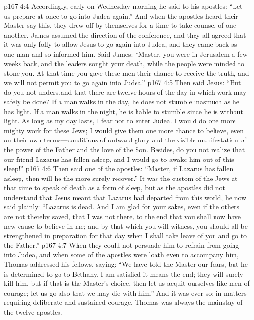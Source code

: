 \pc \vs p167 4:4 Accordingly, early on Wednesday morning he said to his apostles: \textcolor{ubdarkred}{“Let us prepare at once to go into Judea again.”} And when the apostles heard their Master say this, they drew off by themselves for a time to take counsel of one another. James assumed the direction of the conference, and they all agreed that it was only folly to allow Jesus to go again into Judea, and they came back as one man and so informed him. Said James: “Master, you were in Jerusalem a few weeks back, and the leaders sought your death, while the people were minded to stone you. At that time you gave these men their chance to receive the truth, and we will not permit you to go again into Judea.”
\vs p167 4:5 Then said Jesus: \textcolor{ubdarkred}{“But do you not understand that there are twelve hours of the day in which work may safely be done? If a man walks in the day, he does not stumble inasmuch as he has light. If a man walks in the night, he is liable to stumble since he is without light. As long as my day lasts, I fear not to enter Judea. I would do one more mighty work for these Jews; I would give them one more chance to believe, even on their own terms---conditions of outward glory and the visible manifestation of the power of the Father and the love of the Son. Besides, do you not realize that our friend Lazarus has fallen asleep, and I would go to awake him out of this sleep!”}
\vs p167 4:6 Then said one of the apostles: “Master, if Lazarus has fallen asleep, then will he the more surely recover.” It was the custom of the Jews at that time to speak of death as a form of sleep, but as the apostles did not understand that Jesus meant that Lazarus had departed from this world, he now said plainly: \textcolor{ubdarkred}{“Lazarus is dead. And I am glad for your sakes, even if the others are not thereby saved, that I was not there, to the end that you shall now have new cause to believe in me; and by that which you will witness, you should all be strengthened in preparation for that day when I shall take leave of you and go to the Father.”}
\vs p167 4:7 When they could not persuade him to refrain from going into Judea, and when some of the apostles were loath even to accompany him, Thomas addressed his fellows, saying: “We have told the Master our fears, but he is determined to go to Bethany. I am satisfied it means the end; they will surely kill him, but if that is the Master’s choice, then let us acquit ourselves like men of courage; let us go also that we may die with him.” And it was ever so; in matters requiring deliberate and sustained courage, Thomas was always the mainstay of the twelve apostles.
